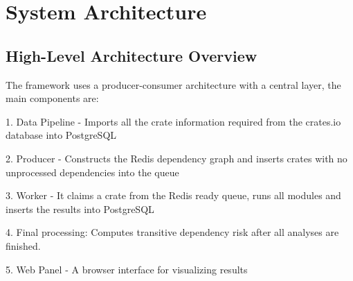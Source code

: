 \chapter{System Architecture}\label{chapter:chap4}

\section{High-Level Architecture Overview}\label{sect:arch-overview}

The framework uses a producer-consumer architecture with a central layer, the main components are:

1. Data Pipeline - Imports all the crate information required from the crates.io database into PostgreSQL

2. Producer - Constructs the Redis dependency graph and inserts crates with no unprocessed dependencies into the queue

3. Worker - It claims a crate from the Redis ready queue, runs all modules and inserts the results into PostgreSQL

4. Final processing: Computes transitive dependency risk after all analyses are finished.

5. Web Panel - A browser interface for visualizing results

